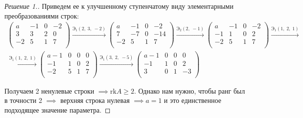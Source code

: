 \documentclass[a4paper]{article}
\theoremstyle{remark}
\newcommand{\arron}[3]{%
  \ensuremath{\xrightarrow{\text{Э}_1(#1,\; #2,\; #3)}}%
}
\newcommand{\arrtw}[2]{%
  \ensuremath{\xrightarrow{\text{Э}_2(#1,\; #2)}}%
}
\begin{document}
\begin{proof}[Решение 1.]
            Приведем ее к улучшенному ступенчатому виду элементарными преобразованиями строк: 
            \begin{multline*}
                \begin{pmatrix}
                    a & -1 & 0 & -2 \\ 
                    3 & 3 & 2 & 0 \\ 
                    -2 & 5 & 1 & 7 \\ 
                \end{pmatrix} 
                \arron{2}{3}{-2}
                \begin{pmatrix}
                    a & -1 & 0 & -2 \\ 
                    7 & -7 & 0 & -14 \\ 
                    -2 & 5 & 1 & 7 \\ 
                \end{pmatrix}
                \arrtw{2}{-1}
                \begin{pmatrix}
                    a & -1 & 0 & -2 \\ 
                    -1 & 1 & 0 & 2 \\ 
                    -2 & 5 & 1 & 7 \\ 
                \end{pmatrix}
                \arron{1}{2}{1}\\
                \arron{1}{2}{1}
                \begin{pmatrix}
                    a-1 & 0 & 0 & 0 \\ 
                    -1 & 1 & 0 & 2 \\ 
                    -2 & 5 & 1 & 7 \\ 
                \end{pmatrix}
                \arron{3}{2}{-5}
                \begin{pmatrix}
                    a-1 & 0 & 0 & 0 \\ 
                    -1 & 1 & 0 & 2 \\ 
                    3 & 0 & 1 & -3 \\ 
                \end{pmatrix}
            \end{multline*}

            Получаем 2 ненулевые строки $\implies \text{rk}A \geqslant 2$. Однако нам нужно, 
            чтобы ранг был в точности 2 $\implies$ верхняя строка нулевая $\implies a = 1$ и это 
            единственное подходящее значение параметра.


\end{proof}
\end{document}
